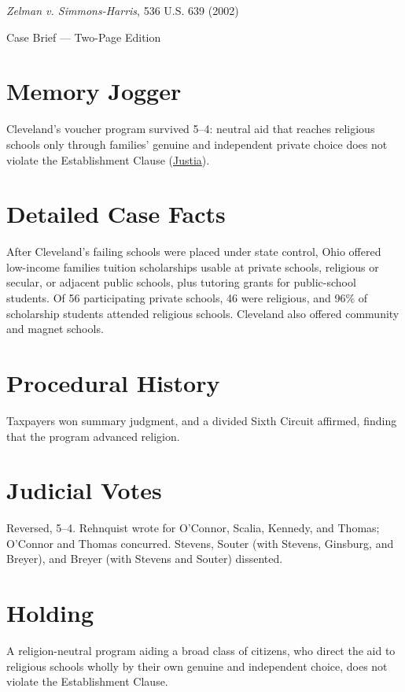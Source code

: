 \documentclass[12pt]{article}
\begin{document}
\begin{center}
{\LARGE \textit{Zelman v. Simmons-Harris}, 536 U.S. 639 (2002)\par}
\vspace{0.5em}
{\large Case Brief --- Two-Page Edition\par}
\end{center}

\section{Memory Jogger}
Cleveland's voucher program survived 5--4: neutral aid that reaches religious schools only through families' genuine and independent private choice does not violate the Establishment Clause (\href{https://supreme.justia.com/cases/federal/us/536/639/}{Justia}).

\section{Detailed Case Facts}
After Cleveland's failing schools were placed under state control, Ohio offered low-income families tuition scholarships usable at private schools, religious or secular, or adjacent public schools, plus tutoring grants for public-school students. Of 56 participating private schools, 46 were religious, and 96\% of scholarship students attended religious schools. Cleveland also offered community and magnet schools.

\section{Procedural History}
Taxpayers won summary judgment, and a divided Sixth Circuit affirmed, finding that the program advanced religion.

\section{Judicial Votes}
Reversed, 5--4. Rehnquist wrote for O'Connor, Scalia, Kennedy, and Thomas; O'Connor and Thomas concurred. Stevens, Souter (with Stevens, Ginsburg, and Breyer), and Breyer (with Stevens and Souter) dissented.

\section{Holding}
A religion-neutral program aiding a broad class of citizens, who direct the aid to religious schools wholly by their own genuine and independent choice, does not violate the Establishment Clause.
\end{document}
